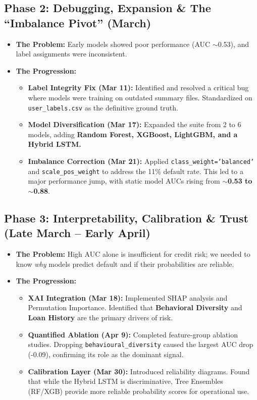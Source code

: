 \documentclass[11pt]{article}
\begin{document}
\subsection{Phase 2: Debugging, Expansion \& The ``Imbalance Pivot'' (March)}
\begin{itemize}[noitemsep]
    \item \textbf{The Problem:} Early models showed poor performance (AUC $\sim$0.53), and label assignments were inconsistent.
    \item \textbf{The Progression:}
    \begin{itemize}
        \item \textbf{Label Integrity Fix (Mar 11):} Identified and resolved a critical bug where models were training on outdated summary files. Standardized on \texttt{user\_labels.csv} as the definitive ground truth.
        \item \textbf{Model Diversification (Mar 17):} Expanded the suite from 2 to 6 models, adding \textbf{Random Forest, XGBoost, LightGBM, and a Hybrid LSTM.}
        \item \textbf{Imbalance Correction (Mar 21):} Applied \texttt{class\_weight='balanced'} and \texttt{scale\_pos\_weight} to address the 11\% default rate. This led to a major performance jump, with static model AUCs rising from \textbf{$\sim$0.53 to $\sim$0.88}.
    \end{itemize}
\end{itemize}

\subsection{Phase 3: Interpretability, Calibration \& Trust (Late March -- Early April)}
\begin{itemize}[noitemsep]
    \item \textbf{The Problem:} High AUC alone is insufficient for credit risk; we needed to know \textit{why} models predict default and if their probabilities are reliable.
    \item \textbf{The Progression:}
    \begin{itemize}
        \item \textbf{XAI Integration (Mar 18):} Implemented SHAP analysis and Permutation Importance. Identified that \textbf{Behavioral Diversity} and \textbf{Loan History} are the primary drivers of risk.
        \item \textbf{Quantified Ablation (Apr 9):} Completed feature-group ablation studies. Dropping \texttt{behavioural\_diversity} caused the largest AUC drop (-0.09), confirming its role as the dominant signal.
        \item \textbf{Calibration Layer (Mar 30):} Introduced reliability diagrams. Found that while the Hybrid LSTM is discriminative, Tree Ensembles (RF/XGB) provide more reliable probability scores for operational use.
    \end{itemize}
\end{itemize}
\end{document}
